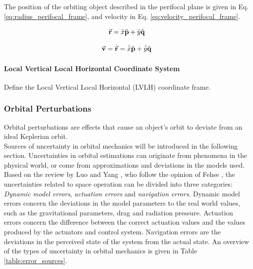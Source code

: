 The position of the orbiting object described in the perifocal plane is given in Eq. \ref{eq:radius_perifocal_frame}, and velocity in Eq. \ref{eq:velocity_perifocal_frame}.

\begin{equation}
    \Vec{\mathbf{r}} = \Bar{x}\hat{\mathbf{p}} + \Bar{y}\hat{\mathbf{q}}
    \label{eq:radius_perifocal_frame}
\end{equation}

\begin{equation}
    \Vec{\mathbf{v}} = \dot{\Vec{\mathbf{r}}} = \dot{\Bar{x}}\hat{\mathbf{p}} + \dot{\Bar{y}}\hat{\mathbf{q}}
    \label{eq:velocity_perifocal_frame}
\end{equation}


\paragraph{Local Vertical Local Horizontal Coordinate System} 

Define the Local Vertical Local Horizontal (LVLH) coordinate frame. \\  






\subsubsection{Orbital Perturbations}

Orbital perturbations are effects that cause an object's orbit to deviate from an ideal Keplerian orbit.\\


Sources of uncertainty in orbital mechanics will be introduced in the following section. Uncertainties in orbital estimations can originate from phenomena in the physical world, or come from approximations and deviations in the models used.  \\

Based on the review by Luo and Yang \cite{luo_review_2017}, who follow the opinion of Fehse \cite{2003ARaD}, the uncertainties related to space operation can be divided into three categories: \textit{Dynamic model errors}, \textit{actuation errors} and \textit{navigation errors}. Dynamic model errors concern the deviations in the model parameters to the real world values, such as the gravitational parameters, drag and radiation pressure. Actuation errors concern the difference between the correct actuation values and the values produced by the actuators and control system. Navigation errors are the deviations in the perceived state of the system from the actual state. An overview of the types of uncertainty in orbital mechanics is given in Table \ref{table:error_sources}.\\



